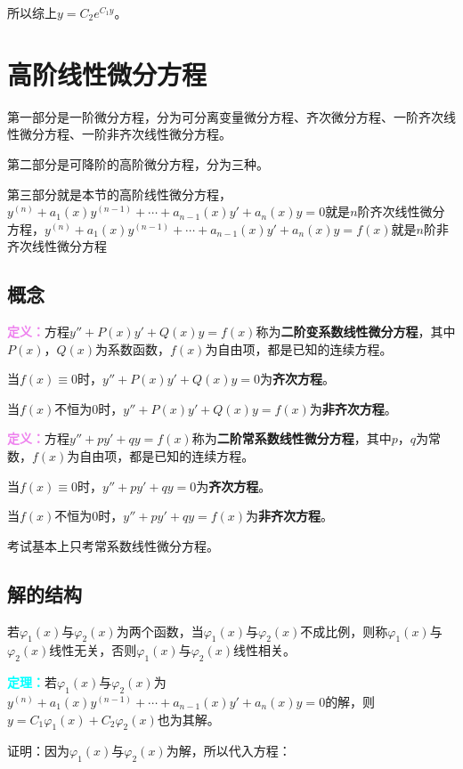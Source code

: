 \documentclass[UTF8, 12pt]{ctexart}
\begin{document}
所以综上$y=C_2e^{C_1y}$。

\section{高阶线性微分方程}

第一部分是一阶微分方程，分为可分离变量微分方程、齐次微分方程、一阶齐次线性微分方程、一阶非齐次线性微分方程。

第二部分是可降阶的高阶微分方程，分为三种。

第三部分就是本节的高阶线性微分方程，$y^{(n)}+a_1(x)y^{(n-1)}+\cdots+a_{n-1}(x)y'+a_n(x)y=0$就是$n$阶齐次线性微分方程，$y^{(n)}+a_1(x)y^{(n-1)}+\cdots+a_{n-1}(x)y'+a_n(x)y=f(x)$就是$n$阶非齐次线性微分方程

\subsection{概念}

\textcolor{violet}{\textbf{定义：}}方程$y''+P(x)y'+Q(x)y=f(x)$称为\textbf{二阶变系数线性微分方程}，其中$P(x)$，$Q(x)$为系数函数，$f(x)$为自由项，都是已知的连续方程。

当$f(x)\equiv0$时，$y''+P(x)y'+Q(x)y=0$为\textbf{齐次方程}。

当$f(x)$不恒为0时，$y''+P(x)y'+Q(x)y=f(x)$为\textbf{非齐次方程}。

\textcolor{violet}{\textbf{定义：}}方程$y''+py'+qy=f(x)$称为\textbf{二阶常系数线性微分方程}，其中$p$，$q$为常数，$f(x)$为自由项，都是已知的连续方程。

当$f(x)\equiv0$时，$y''+py'+qy=0$为\textbf{齐次方程}。

当$f(x)$不恒为0时，$y''+py'+qy=f(x)$为\textbf{非齐次方程}。

考试基本上只考常系数线性微分方程。

\subsection{解的结构}

若$\varphi_1(x)$与$\varphi_2(x)$为两个函数，当$\varphi_1(x)$与$\varphi_2(x)$不成比例，则称$\varphi_1(x)$与$\varphi_2(x)$线性无关，否则$\varphi_1(x)$与$\varphi_2(x)$线性相关。

\textcolor{aqua}{\textbf{定理：}}若$\varphi_1(x)$与$\varphi_2(x)$为$y^{(n)}+a_1(x)y^{(n-1)}+\cdots+a_{n-1}(x)y'+a_n(x)y=0$的解，则$y=C_1\varphi_1(x)+C_2\varphi_2(x)$也为其解。

证明：因为$\varphi_1(x)$与$\varphi_2(x)$为解，所以代入方程：
\end{document}
